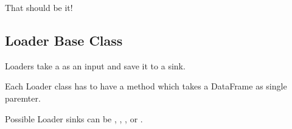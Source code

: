 \documentclass[a4paper,10pt, twoside,english]{sphinxmanual}
\begin{document}
That should be it!


\subsection{Loader Base Class}
\label{\detokenize{base_classes/loader:module-spooq2.loader.loader}}\label{\detokenize{base_classes/loader:loader-base-class}}\label{\detokenize{base_classes/loader::doc}}
Loaders take a  as an input and save it to a sink.

Each Loader class has to have a  method which takes a DataFrame as single paremter.

Possible Loader sinks can be , , ,  or .
\end{document}
